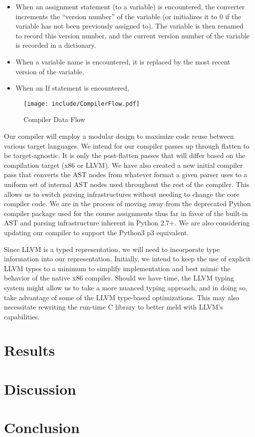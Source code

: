 \documentclass[11pt]{article}
\begin{document}
\begin{itemize}
\item When an assignment statement (to a variable) is encountered, the
  converter increments the ``version number'' of the variable (or
  initializes it to $0$ if the variable has not been previously
  assigned to). The variable is then renamed to record this version
  number, and the current version number of the variable is recorded
  in a dictionary.
\item When a variable name is encountered, it is replaced by the most
  recent version of the variable.
\item When an If statement is encountered, 

\end{itemize}

\begin{figure}[htb]
  \centering
  \texttt{[image: include/CompilerFlow.pdf]}
  \caption{Compiler Data Flow}
  \label{fig:CompilerFlow}
\end{figure}

Our compiler will employ a modular design to maximize code reuse
between various target languages.  We intend for our compiler passes
up through flatten to be target-agnostic. It is only the post-flatten
passes that will differ based on the compilation target (x86 or
LLVM). We have also created a new initial compiler pass that converts
the AST nodes from whatever format a given parser uses to a uniform
set of internal AST nodes used throughout the rest of the
compiler. This allows us to switch parsing infrastructures without
needing to change the core compiler code. We are in the process of
moving away from the deprecated Python compiler package used for the
course assignments thus far in favor of the built-in AST and parsing
infrastructure inherent in Python 2.7+. We are also considering
updating our compiler to support the Python3 p3 equivalent.

Since LLVM is a typed representation, we will need to incorporate type
information into our representation. Initially, we intend to keep the
use of explicit LLVM types to a minimum to simplify implementation and
best mimic the behavior of the native x86 compiler. Should we have
time, the LLVM typing system might allow us to take a more nuanced
typing approach, and in doing so, take advantage of some of the LLVM
type-based optimizations. This may also necessitate rewriting the
run-time C library to better meld with LLVM's capabilities.

\section{Results}

\section{Discussion}

\section{Conclusion}

\nocite{*}
\printbibliography
\end{document}
